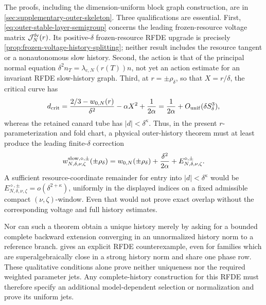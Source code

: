 The proofs, including the dimension-uniform block graph construction, are in
\cref{sec:supplementary-outer-skeleton}.  Three qualifications are essential.
First, \cref{eq:outer-stable-layer-semigroup} concerns the leading
frozen-resource voltage matrix \(\mathcal J^{\rm fv}_{N}(r)\).  Its
positive-\(\delta\) frozen-resource RFDE upgrade is precisely
\cref{prop:frozen-voltage-history-splitting}; neither result includes the
resource tangent or a nonautonomous slow history.  Second, the action is that of the principal
normal equation \(\delta^2n_T=\lambda_{c,N}(r(T))n\), not yet an action
estimate for an invariant RFDE slow-history graph.  Third, at
\(r=\pm\rho_\delta\), so that \(X=r/\delta\), the critical curve has
\begin{equation}
 d_{\rm crit}
 =\frac{2/3-w_{0,N}(r)}{\delta^2}-\alpha X^2
      +\frac1{2\alpha}
 =\frac1{2\alpha}+O_{\rm unif}(\delta S_\delta^3),            \label{eq:outer-critical-fold-offset}
\end{equation}
whereas the retained canard tube has \(|d|<\delta^\kappa\).  Thus, in the
present \(r\)-parameterization and fold chart, a physical outer-history
theorem must at least produce the leading finite-\(\delta\) correction
\begin{equation}
 w^{{\rm slow},\diamond,\pm}_{N,\delta,\nu,\zeta}(\pm\rho_\delta)
 =w_{0,N}(\pm\rho_\delta)+\frac{\delta^2}{2\alpha}
   +E^{\diamond,\pm}_{N,\delta,\nu,\zeta}.          \label{eq:outer-required-resource-correction}
\end{equation}
A sufficient resource-coordinate remainder for entry into
\(|d|<\delta^\kappa\) would be
\(E^{\diamond,\pm}_{N,\delta,\nu,\zeta}
=o(\delta^{2+\kappa})\), uniformly in the displayed indices on a fixed
admissible compact \((\nu,\zeta)\)-window.  Even that
would not prove exact overlap without the corresponding voltage and full
history estimates.

Nor can such a theorem obtain a unique history merely by asking for a
bounded complete backward extension converging in an unnormalized history
norm to a reference branch.
 gives an explicit RFDE
counterexample, even for families which are superalgebraically close in a
strong history norm and share one phase row.  These qualitative conditions
alone prove neither uniqueness nor the required weighted parameter jets.
Any complete-history construction for this RFDE must therefore specify an
additional model-dependent selection or normalization and prove its uniform
jets.
